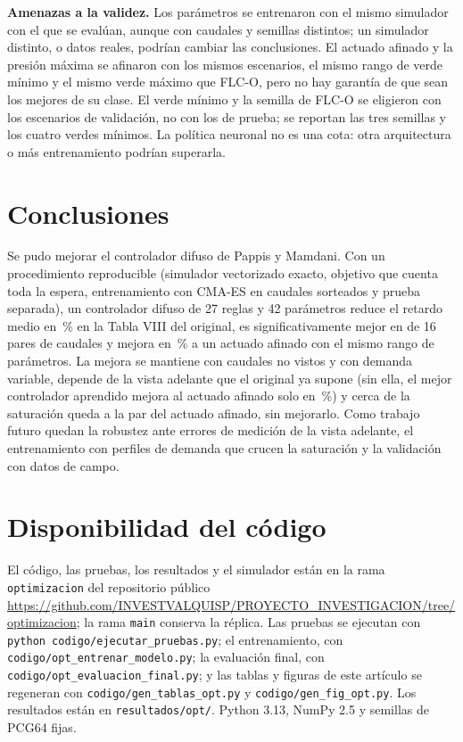\documentclass[journal]{IEEEtran}
\newcommand{\FLC}{FLC-O}
\begin{document}
\textbf{Amenazas a la validez.} Los parámetros se entrenaron con el mismo simulador con el que se evalúan, aunque con caudales y semillas distintos; un simulador distinto, o datos reales, podrían cambiar las conclusiones. El actuado afinado y la presión máxima se afinaron con los mismos escenarios, el mismo rango de verde mínimo y el mismo verde máximo que \FLC{}, pero no hay garantía de que sean los mejores de su clase. El verde mínimo y la semilla de \FLC{} se eligieron con los escenarios de validación, no con los de prueba; se reportan las tres semillas y los cuatro verdes mínimos. La política neuronal no es una cota: otra arquitectura o más entrenamiento podrían superarla.

\section{Conclusiones}
\label{sec:conclusiones}

Se pudo mejorar el controlador difuso de Pappis y Mamdani. Con un procedimiento reproducible (simulador vectorizado exacto, objetivo que cuenta toda la espera, entrenamiento con CMA-ES en caudales sorteados y prueba separada), un controlador difuso de 27 reglas y 42 parámetros reduce el retardo medio en \RedFlc\,\% en la Tabla VIII del original, es significativamente mejor en \ParMejorPap{} de 16 pares de caudales y mejora en \RedActAfOf\,\% a un actuado afinado con el mismo rango de parámetros. La mejora se mantiene con caudales no vistos y con demanda variable, depende de la vista adelante que el original ya supone (sin ella, el mejor controlador aprendido mejora al actuado afinado solo en \RedActMlpC\,\%) y cerca de la saturación queda a la par del actuado afinado, sin mejorarlo. Como trabajo futuro quedan la robustez ante errores de medición de la vista adelante, el entrenamiento con perfiles de demanda que crucen la saturación y la validación con datos de campo.

\section*{Disponibilidad del código}
\label{sec:disp}
\raggedright El código, las pruebas, los resultados y el simulador están en la rama \texttt{optimizacion} del repositorio público \url{https://github.com/INVESTVALQUISP/PROYECTO_INVESTIGACION/tree/optimizacion}; la rama \texttt{main} conserva la réplica. Las pruebas se ejecutan con \texttt{python codigo/ejecutar\_pruebas.py}; el entrenamiento, con \texttt{codigo/opt\_entrenar\_modelo.py}; la evaluación final, con \texttt{codigo/opt\_evaluacion\_final.py}; y las tablas y figuras de este artículo se regeneran con \texttt{codigo/gen\_tablas\_opt.py} y \texttt{codigo/gen\_fig\_opt.py}. Los resultados están en \texttt{resultados/opt/}. Python 3.13, NumPy 2.5 y semillas de PCG64 fijas.



\end{document}
